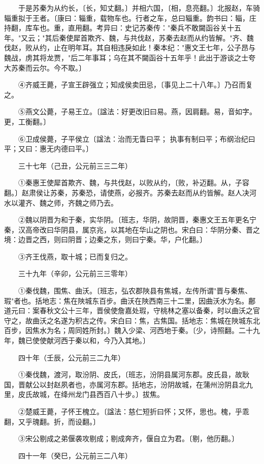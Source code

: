　　于是苏秦为从约长，〔长，知丈翻。〕并相六国，〔相，息亮翻。〕北报赵，车骑辎重拟于王者。〔康曰：辎重，载物车也。行者之车，总曰辎重。韵书曰：辎，庄持翻，库车也。重，直用翻。考异曰：史记苏秦传："秦兵不敢闚函谷关十五年。"又云；"其后秦使犀首欺齐、魏，与共伐赵，苏秦去赵而从约皆解。"齐、魏伐赵，败从约，止在明年耳。其自相违戾如此！秦本纪："惠文王七年，公子昂与魏战，虏其将龙贾，"后二年事耳；乌在其不闚函谷十五年乎！此出于游谈之士夸大苏秦而云尔。今不取。〕

　　④齐威王薨，子宣王辟强立；知成侯卖田忌，〔事见上二十八年。〕乃召而复之。

　　⑤燕文公薨，子易王立。〔諡法：好更改旧曰易。燕，因肩翻。易，音如字。更，工衡翻。〕

　　⑥卫成侯薨，子平侯立〔諡法：治而无眚曰平； 执事有制曰平；布纲治纪曰平；又曰：惠无内德曰平。〕

　　三十七年（己丑，公元前三三二年）

　　①秦惠王使犀首欺齐、魏，与共伐赵，以败从约，〔败，补迈翻。从，子容翻。〕赵肃侯让苏秦，苏秦恐，请使燕，必报齐。苏秦去赵而从约皆解。赵人决河水以灌齐、魏之师，齐魏之师乃去。

　　②魏以阴晋为和于秦，实华阴。〔班志，华阴，故阴晋，秦惠文王五年更名宁秦，汉高帝改曰华阴县，属京兆，以其地在华山之阴也。宋白曰：华阴分秦、晋之境：边晋之西，则曰阴晋；边秦之东，则曰宁秦。华，户化翻。〕

　　③齐王伐燕，取十城；已而复归之。

　　三十九年（辛卯，公元前三三零年）

　　①秦伐魏，围焦、曲沃。〔班志，弘农郡陜县有焦城，左传所谓"晋与秦焦、瑕"者也。括地志：焦在陜城东百步。曲沃在陜西南三十二里，因曲沃水为名。鄜道元曰：案春秋文公十三年，晋侯使詹嘉处瑕，守桃林之塞以备秦，时以曲沃之官守之，故曲沃之名遂为积古之传。宋白曰：焦，古焦国。括地志：焦城在陜城东北百步，因焦水为名；周同姓所封。〕魏入少梁、河西地于秦。〔少，诗照翻。二十九年，魏已使使献河西于秦以和，今乃入其地。〕

　　四十年（壬辰，公元前三二九年）

　　①秦伐魏，渡河，取汾阴、皮氏，〔班志，汾阴县属河东郡。皮氏县，故耿国，晋献公以封赵夙者也，亦属河东郡。括地志，汾阴故城，在蒲州汾阴县北九里，皮氏故城，在绛州龙门县西百八十步。〕拔焦。

　　②楚威王薨，子怀王槐立。〔諡法：慈仁短折曰怀；又怀，思也。槐，乎乖翻，又乎瑰翻。折，而设翻。〕

　　③宋公剔成之弟偃袭攻剔成；剔成奔齐，偃自立为君。〔剔，他历翻。〕

　　四十一年（癸巳，公元前三二八年）

